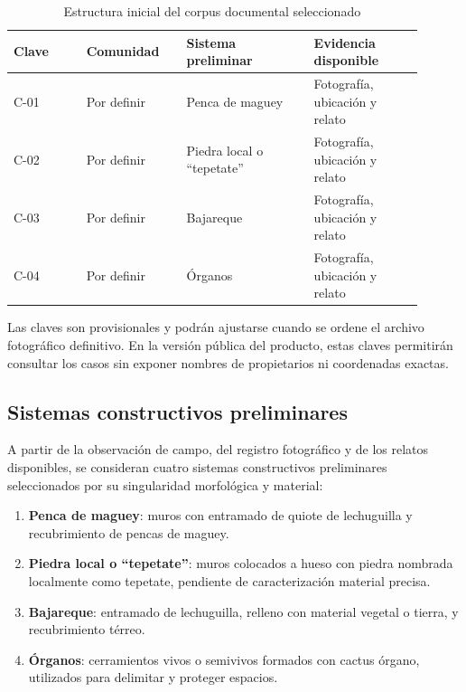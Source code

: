 \begin{table}[ht]
	\centering
\caption{Estructura inicial del corpus documental seleccionado}
	\vspace{0.25cm}
	\label{tab:corpus_inicial}
	\begin{tabular}{@{}L{0.16\linewidth}L{0.22\linewidth}L{0.28\linewidth}L{0.24\linewidth}@{}}
		\toprule
		\textbf{Clave} & \textbf{Comunidad} & \textbf{Sistema preliminar} & \textbf{Evidencia disponible} \\
		\midrule
		C-01 & Por definir & Penca de maguey & Fotografía, ubicación y relato \\
		C-02 & Por definir & Piedra local o ``tepetate'' & Fotografía, ubicación y relato \\
		C-03 & Por definir & Bajareque & Fotografía, ubicación y relato \\
		C-04 & Por definir & Órganos & Fotografía, ubicación y relato \\
		\bottomrule
	\end{tabular}
\end{table}

Las claves son provisionales y podrán ajustarse cuando se ordene el archivo fotográfico definitivo. En la versión pública del producto, estas claves permitirán consultar los casos sin exponer nombres de propietarios ni coordenadas exactas.

\subsection{Sistemas constructivos preliminares}

A partir de la observación de campo, del registro fotográfico y de los relatos disponibles, se consideran cuatro sistemas constructivos preliminares seleccionados por su singularidad morfológica y material:

\begin{enumerate}
	\item \textbf{Penca de maguey}: muros con entramado de quiote de lechuguilla y recubrimiento de pencas de maguey.
	\item \textbf{Piedra local o ``tepetate''}: muros colocados a hueso con piedra nombrada localmente como tepetate, pendiente de caracterización material precisa.
	\item \textbf{Bajareque}: entramado de lechuguilla, relleno con material vegetal o tierra, y recubrimiento térreo.
	\item \textbf{Órganos}: cerramientos vivos o semivivos formados con cactus órgano, utilizados para delimitar y proteger espacios.
\end{enumerate}

